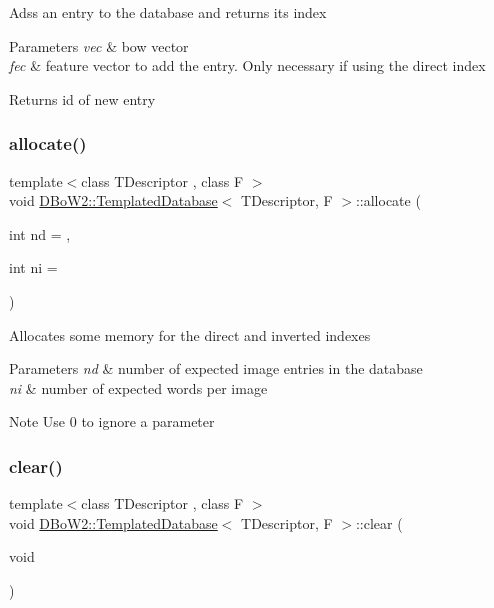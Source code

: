Adss an entry to the database and returns its index 
\begin{DoxyParams}{Parameters}
{\em vec} & bow vector \\
\hline
{\em fec} & feature vector to add the entry. Only necessary if using the direct index \\
\hline
\end{DoxyParams}
\begin{DoxyReturn}{Returns}
id of new entry 
\end{DoxyReturn}
\mbox{\label{classDBoW2_1_1TemplatedDatabase_a5b410217ede05dc0920e2adc1e20b4b5}} 
\subsubsection{\texorpdfstring{allocate()}{allocate()}}
{\footnotesize\ttfamily template$<$class T\+Descriptor , class F $>$ \\
void \hyperlink{classDBoW2_1_1TemplatedDatabase}{D\+Bo\+W2\+::\+Templated\+Database}$<$ T\+Descriptor, F $>$\+::allocate (\begin{DoxyParamCaption}\item[{int}]{nd = {},  }\item[{int}]{ni = {} }\end{DoxyParamCaption})}

Allocates some memory for the direct and inverted indexes 
\begin{DoxyParams}{Parameters}
{\em nd} & number of expected image entries in the database \\
\hline
{\em ni} & number of expected words per image \\
\hline
\end{DoxyParams}
\begin{DoxyNote}{Note}
Use 0 to ignore a parameter 
\end{DoxyNote}
\mbox{\label{classDBoW2_1_1TemplatedDatabase_a88fe9b880f9b753de1ea6e07fe42808b}} 
\subsubsection{\texorpdfstring{clear()}{clear()}}
{\footnotesize\ttfamily template$<$class T\+Descriptor , class F $>$ \\
void \hyperlink{classDBoW2_1_1TemplatedDatabase}{D\+Bo\+W2\+::\+Templated\+Database}$<$ T\+Descriptor, F $>$\+::clear (\begin{DoxyParamCaption}\item[{void}]{ }\end{DoxyParamCaption})\hspace{0.3cm}{\ttfamily [inline]}}

